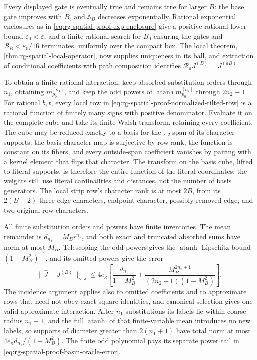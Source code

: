 Every displayed gate is eventually true and remains true for larger \(B\):
the base gate improves with \(B\), and \(\mathbb A_B\) decreases
exponentially. Rational exponential enclosures as in
\cref{eq:rg-spatial-proof-exp-enclosure} give a positive rational lower
bound \(\varepsilon_0<\varepsilon\), and a finite rational search for
\(B_0\) ensuring the gates and \(\mathcal B_B<\varepsilon_0/16\)
terminates, uniformly over the compact box. The local theorem,
\cref{thm:rg-spatial-local-operator}, now supplies uniqueness in its ball,
and extraction of conditional coefficients with path composition identifies
\(\mathscr R_aJ^{(B)}=J^{(aB)}\).

To obtain a finite rational interaction, keep absorbed substitution orders
through \(n_1\), obtaining \(m^{[n_1]}_{p_0}\), and keep the odd powers of
\(\operatorname{atanh}m^{[n_1]}_{p_0}\) through \(2n_2-1\). For rational
\(b,t\), every local row in \cref{eq:rg-spatial-proof-normalized-tilted-row}
is a rational function of finitely many signs with positive denominator.
Evaluate it on the complete cube and take its finite Walsh transform,
retaining every coefficient. The cube may be reduced exactly to a basis for
the \(\mathbb F_2\)-span of its character supports: the basis-character map
is surjective by row rank, the function is constant on its fibers, and
every outside-span coefficient vanishes by pairing with a kernel element
that flips that character. The transform on the basis cube, lifted to
literal supports, is therefore the entire function of the literal
coordinates; the weights still use literal cardinalities and distances, not
the number of basis generators. The local strip row's character rank is at
most \(2B\), from its \(2(B-2)\) three-edge characters, endpoint character,
possibly removed edge, and two original row characters.

All finite substitution orders and powers have finite inventories. The mean
remainder is \(d_{n_1}=M_Br^{n_1}\), and both exact and truncated absorbed
sums have norm at most \(M_B\). Telescoping the odd powers gives the
\(\operatorname{atanh}\) Lipschitz bound \((1-M_B^2)^{-1}\), and its omitted
powers give the error
\begin{equation}
 \|\widehat J-J^{(B)}\|_{\kappa,\lambda}
 \le4\bar e_\kappa\left[
       \frac{d_{n_1}}{1-M_B^2}
       +\frac{M_B^{2n_2+1}}{(2n_2+1)(1-M_B^2)}\right].
 \label{eq:rg-spatial-proof-basin-oracle-error}
\end{equation}
The incidence argument applies also to omitted coefficients and to
approximate rows that need not obey exact square identities, and canonical
selection gives one valid approximate interaction. After \(n_1\)
substitutions its labels lie within coarse radius \(n_1+1\), and the full
\(\operatorname{atanh}\) of that finite-variable mean introduces no new
labels, so supports of diameter greater than \(2(n_1+1)\) have total norm at
most \(4\bar e_\kappa d_{n_1}/(1-M_B^2)\). The finite odd polynomial pays
its separate power tail in \cref{eq:rg-spatial-proof-basin-oracle-error}.

